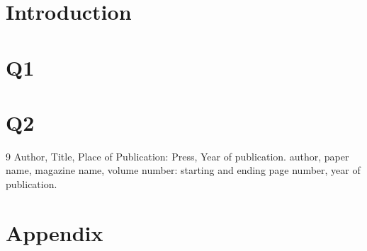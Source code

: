 \documentclass{apmcmthesis}
\begin{document}
\pagestyle{frontmatterstyle}

\begin{abstract} 
    
This is abstract of this thesis

\end{abstract}



\newpage
\tableofcontents


\newpage
\pagestyle{mainmatterstyle}
\setcounter{page}{1}

\section{Introduction}




\section{Q1}



\section{Q2}




\begin{thebibliography}{9}%
 Author, Title, Place of Publication: Press, Year of publication.
 author, paper name, magazine name, volume number: starting and ending
page number, year of publication.
\end{thebibliography}

\newpage

\section{Appendix}
\end{document}
